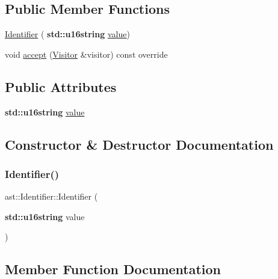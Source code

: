 \subsection*{Public Member Functions}
\begin{DoxyCompactItemize}
\item 
\hyperlink{structast_1_1_identifier_ad1c565306c43b4b5fcacee989b9bab6f}{Identifier} (\textbf{ std\+::u16string} \hyperlink{structast_1_1_identifier_a94073f3af4a0e4accf4dfd4efb8e572e}{value})
\item 
void \hyperlink{structast_1_1_identifier_a4be0b28397f057ed7ec88234bb23bded}{accept} (\hyperlink{structast_1_1_visitor}{Visitor} \&visitor) const override
\end{DoxyCompactItemize}
\subsection*{Public Attributes}
\begin{DoxyCompactItemize}
\item 
\textbf{ std\+::u16string} \hyperlink{structast_1_1_identifier_a94073f3af4a0e4accf4dfd4efb8e572e}{value}
\end{DoxyCompactItemize}


\subsection{Constructor \& Destructor Documentation}
\mbox{\label{structast_1_1_identifier_ad1c565306c43b4b5fcacee989b9bab6f}} 
\subsubsection{\texorpdfstring{Identifier()}{Identifier()}}
{\footnotesize\ttfamily ast\+::\+Identifier\+::\+Identifier (\begin{DoxyParamCaption}\item[{\textbf{ std\+::u16string}}]{value }\end{DoxyParamCaption})\hspace{0.3cm}{\ttfamily [inline]}}



\subsection{Member Function Documentation}
\mbox{\label{structast_1_1_identifier_a4be0b28397f057ed7ec88234bb23bded}} 
